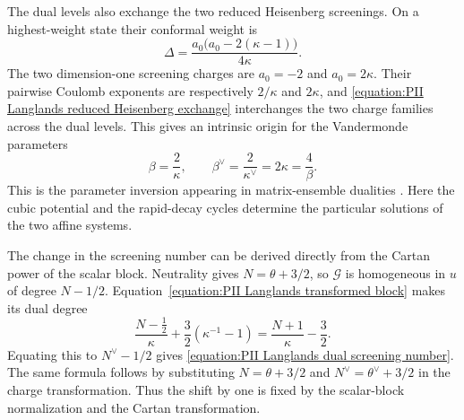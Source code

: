 \documentclass[a4paper,11pt]{article}
\numberwithin{equation}{section}
\begin{document}
The dual levels also exchange the two reduced
Heisenberg screenings.  On a highest-weight state their conformal
weight is
\begin{equation}
	\Delta=\frac{a_{0}\bigl(a_{0}-2(\kappa-1)\bigr)}{4\kappa}.
\end{equation}
The two dimension-one screening charges are $a_{0}=-2$ and
$a_{0}=2\kappa$.  Their pairwise Coulomb exponents are respectively
$2/\kappa$ and $2\kappa$, and
\eqref{equation:PII Langlands reduced Heisenberg exchange}
interchanges the two charge families across the dual levels.
This gives an intrinsic origin for the Vandermonde parameters
\begin{equation}
	\beta=\frac{2}{\kappa},\qquad
	\beta^{\vee}=\frac{2}{\kappa^{\vee}}=2\kappa
	=\frac{4}{\beta}.
\end{equation}
This is the parameter inversion appearing in matrix-ensemble
dualities \cite{Desrosiers2009}.  Here the cubic potential and the
rapid-decay cycles determine the particular solutions of the two
affine systems.

The change in the screening number can be derived directly from the
Cartan power of the scalar block.  Neutrality gives
$N=\theta+3/2$, so $\mathcal{G}$ is homogeneous in $u$ of degree
$N-1/2$.  Equation~\eqref{equation:PII Langlands transformed block}
makes its dual degree
\begin{equation}
	\frac{N-\frac{1}{2}}{\kappa}
	+\frac{3}{2}(\kappa^{-1}-1)
	=\frac{N+1}{\kappa}-\frac{3}{2}.
\end{equation}
Equating this to $N^{\vee}-1/2$ gives
\eqref{equation:PII Langlands dual screening number}.
The same formula follows by substituting
$N=\theta+3/2$ and $N^{\vee}=\theta^{\vee}+3/2$ in the charge
transformation.  Thus the shift by one is fixed by the scalar-block
normalization and the Cartan transformation.
\end{document}
